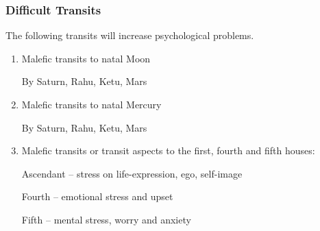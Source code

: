 \subsubsection{Difficult Transits}

 

The following transits will increase psychological problems.
 
\begin{enumerate}

\item Malefic transits to natal Moon

By Saturn, Rahu, Ketu, Mars

 

\item Malefic transits to natal Mercury

By Saturn, Rahu, Ketu, Mars

 

\item Malefic transits or transit aspects to the first, fourth and fifth houses:

Ascendant – stress on life-expression, ego, self-image

Fourth – emotional stress and upset

Fifth – mental stress, worry and anxiety

\end{enumerate}
